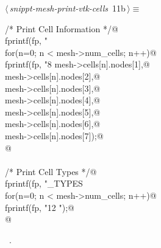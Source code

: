 \documentclass[a4paper,11pt]{article}
\begin{document}
\begin{flushleft} \small
\begin{minipage}{\linewidth}\label{scrap12}\raggedright\small
{} $\langle\,${\itshape snippt-mesh-print-vtk-cells}\nobreak\ {\footnotesize {11b}}$\,\rangle\equiv$
\vspace{-1ex}
\begin{list}{}{} \item
\mbox{}\verb@/* Print Cell Information */@\\
\mbox{}\verb@    fprintf(fp, "\nCELLS %d %d \n", mesh->num_cells, mesh->num_cells * 9);@\\
\mbox{}\verb@@\\
\mbox{}\verb@    for(n=0; n < mesh->num_cells; n++){@\\
\mbox{}\verb@        fprintf(fp, "8 %d %d %d %d %d %d %d %d\n", mesh->cells[n].nodes[0],@\\
\mbox{}\verb@                                                   mesh->cells[n].nodes[1],@\\
\mbox{}\verb@                                                   mesh->cells[n].nodes[2],@\\
\mbox{}\verb@                                                   mesh->cells[n].nodes[3],@\\
\mbox{}\verb@                                                   mesh->cells[n].nodes[4],@\\
\mbox{}\verb@                                                   mesh->cells[n].nodes[5],@\\
\mbox{}\verb@                                                   mesh->cells[n].nodes[6],@\\
\mbox{}\verb@                                                   mesh->cells[n].nodes[7]);@\\
\mbox{}\verb@    }@\\
\mbox{}\verb@@\\
\mbox{}\verb@/* Print Cell Types */@\\
\mbox{}\verb@    fprintf(fp, "\nCELL_TYPES %d \n", mesh->num_cells);@\\
\mbox{}\verb@@\\
\mbox{}\verb@    for(n=0; n < mesh->num_cells; n++){@\\
\mbox{}\verb@        fprintf(fp, "12 \n");@\\
\mbox{}\verb@    }@\\
\mbox{}\verb@@{\NWsep}
\end{list}
\vspace{-1.5ex}
\footnotesize
\begin{list}{}{\setlength{\itemsep}{-\parsep}\setlength{\itemindent}{-\leftmargin}}
\item \NWtxtMacroRefIn\ .

\item{}
\end{list}
\end{minipage}\vspace{4ex}
\end{flushleft}
\end{document}
